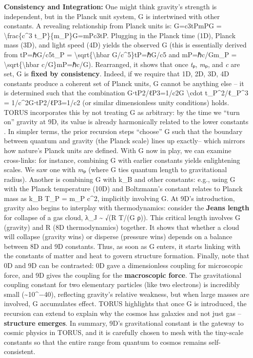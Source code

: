 \textbf{Consistency and Integration:} One might think gravity's strength
is independent, but in the Planck unit system, G is intertwined with
other constants. A revealing relationship from Planck units is:
G=c3tPmPG = \textbackslash{}frac\{c\^{}3 t\_P\}\{m\_P\}G=mP​c3tP​​​.
Plugging in the Planck time (1D), Planck mass (3D), and light speed (4D)
yields the observed G (this is essentially derived from tP=ℏG/c5t\_P =
\textbackslash{}sqrt\{\textbackslash{}hbar G/c\^{}5\}tP​=ℏG/c5​ and
mP=ℏc/Gm\_P = \textbackslash{}sqrt\{\textbackslash{}hbar
c/G\}mP​=ℏc/G​). Rearranged, it shows that once \emph{t}ₚ, \emph{m}ₚ,
and \emph{c} are set, G is \textbf{fixed by consistency}​. Indeed, if we
require that 1D, 2D, 3D, 4D constants produce a coherent set of Planck
units, G cannot be anything else -- it is determined such that the
combination G⋅tP2/ℓP3=1/c2G \textbackslash{}cdot t\_P\^{}2/ℓ\_P\^{}3 =
1/c\^{}2G⋅tP2​/ℓP3​=1/c2 (or similar dimensionless unity conditions)
holds​. TORUS incorporates this by not treating G as arbitrary: by the
time we ``turn on'' gravity at 9D, its value is already harmonically
related to the lower constants​. In simpler terms, the prior recursion
steps ``choose'' G such that the boundary between quantum and gravity
(the Planck scale) lines up exactly​-- which mirrors how nature's Planck
units are defined. With G now in play, we can examine cross-links: for
instance, combining G with earlier constants yields enlightening scales.
We saw one with \emph{m}ₚ (where G ties quantum length to gravitational
radius). Another is combining G with k\_B and other constants: e.g.,
using G with the Planck temperature (10D) and Boltzmann's constant
relates to Planck mass as k\_B T\_P = m\_P c\^{}2, implicitly involving
G​. At 9D's introduction, gravity also begins to interplay with
thermodynamics: consider the \textbf{Jeans length} for collapse of a gas
cloud, λ\_J \textasciitilde{} √(R T/(G ρ)). This critical length
involves G (gravity) and R (8D thermodynamics) together​. It shows that
whether a cloud will collapse (gravity wins) or disperse (pressure wins)
depends on a balance between 8D and 9D constants. Thus, as soon as G
enters, it starts linking with the constants of matter and heat to
govern structure formation. Finally, note that 0D and 9D can be
contrasted: 0D gave a dimensionless coupling for microscopic force, and
9D gives the coupling for the \textbf{macroscopic force}. The
gravitational coupling constant for two elementary particles (like two
electrons) is incredibly small (\textasciitilde{}10\^{}−40), reflecting
gravity's relative weakness, but when large masses are involved, G
accumulates effect. TORUS highlights that once G is introduced, the
recursion can extend to explain why the cosmos has galaxies and not just
gas -- \textbf{structure emerges}. In summary, 9D's gravitational
constant is the gateway to cosmic physics in TORUS, and it is carefully
chosen to mesh with the tiny-scale constants so that the entire range
from quantum to cosmos remains self-consistent.

